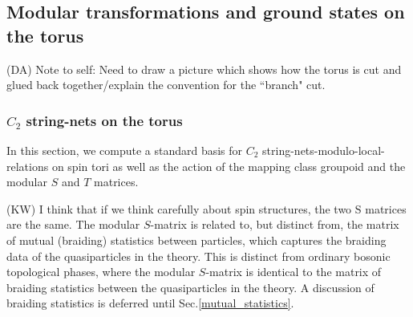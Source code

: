 \documentclass[12pt,a4paper]{article}
\newcommand{\tp}{\otimes}
\newcommand{\unit}{\mathds{1}}
\newcommand{\cc}{\mathbb{C}}
\newcommand{\mcz}{\mathcal{Z}}
\newcommand{\mca}{\mathcal{A}}
\newcommand{\mcv}{\mathcal{V}}
\newcommand{\tube}{\textbf{Tube}}
\newcommand{\kw}[1]{{\color{kwcolor}\footnotesize{(KW) #1}}}
\newcommand{\dave}[1]{{\color{ao(english)}\footnotesize{(DA) #1}}}
\begin{document}
\begin{table}
 
\caption{ \label{fusiontable} The fusion rules in $\tube(C_2) \cong \mcz(C_2)$. 
	\kw{not clear what $\mcz$ means when spin structures are in play.  Probably we should drop reference to $\mcz$.}
	We have defined $\mca = \{ m_\unit, m_\sigma^+, m_\psi \} $ and $\mcv = \{ q_\unit, q_\sigma, q_\psi \}$ as the set of anyons and set of vortices, respectively.
	The ($a$-$b$)th entry in each table is the sum $\oplus_c \Delta_c^{ab} c$, where we have omitted any $\Delta^{ab}_c$ that is equal to $\cc$ and used $\bullet = \mathbb{C}^{1|1}$ to signify that the associated $\Delta^{ab}_c$ is isomorphic to $\cc^{1|1}$.
		Entries with $\cc^{0|1}$ indicate that the fusion channel is purely odd. 
	The fusion spaces can be obtained from this table according to $V^{ab}_c \cong \Delta^{ab}_c \tp \text{End}(c)$.
	For example, $V^{m_\psi q_\sigma}_{q_\sigma} \cong \cc \tp \cc^{1|1} = \cc^{1|1}$.
	}
\end{table}






\subsection{Modular transformations and ground states on the torus} \label{modulartforms}
\dave{Note to self: Need to draw a picture which shows how the torus is cut and glued back 
together/explain the convention for the ``branch" cut.}


\subsubsection{$C_2$ string-nets on the torus} \label{c2_stringnets_torus}

In this section, we compute a standard basis for $C_2$ string-nets-modulo-local-relations on spin tori as well 
as the action of the mapping class groupoid and the modular $S$ and $T$ matrices.

\kw{I think that if we think carefully about spin structures, the two S matrices are the same.}
The modular $S$-matrix is related to, but distinct from, the matrix of mutual (braiding) statistics between particles, which 
captures the braiding data of the quasiparticles in the theory.
This is distinct from ordinary bosonic topological phases, where the modular $S$-matrix is identical to the matrix of 
braiding statistics between the quasiparticles in the theory. 
A discussion of braiding statistics is deferred until Sec.\ref{mutual_statistics}. 
\end{document}
